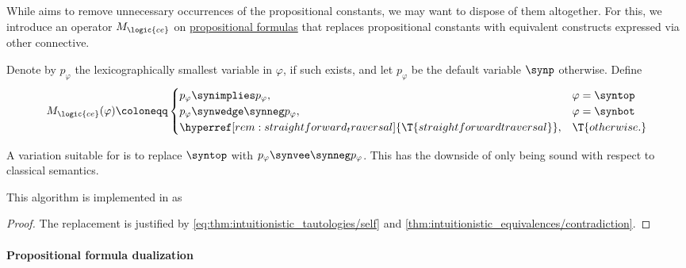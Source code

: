 \begin{algorithm}\label{alg:propositional_constant_expansion}
  While  aims to remove unnecessary occurrences of the propositional constants, we may want to dispose of them altogether. For this, we introduce an operator \( M_{\logic{ce}} \) on \hyperref[def:propositional_formula]{propositional formulas} that replaces propositional constants with equivalent constructs expressed via other connective.

  Denote by \( p_\varphi \) the lexicographically smallest variable in \( \varphi \), if such exists, and let \( p_\varphi \) be the default variable \( \synp \) otherwise. Define
  \begin{equation*}
    M_{\logic{ce}}(\varphi) \coloneqq \begin{cases}
      p_\varphi \synimplies p_\varphi,       &\varphi = \syntop \\
      p_\varphi \synwedge \synneg p_\varphi, &\varphi = \synbot \\
      \hyperref[rem:straightforward_traversal]{\T{straightforward traversal}}, &\T{otherwise.}
    \end{cases}
  \end{equation*}
\end{algorithm}
\begin{comments}
  \item A variation suitable for  is to replace \( \syntop \) with \( p_\varphi \synvee \synneg p_\varphi \). This has the downside of only being sound with respect to classical semantics.

  \item This algorithm is implemented in \cite{notebook:code} as
  \begin{CodeRefDisplay}
  \end{CodeRefDisplay}
\end{comments}
\begin{proof}
  The replacement is justified by \eqref{eq:thm:intuitionistic_tautologies/self} and \cref{thm:intuitionistic_equivalences/contradiction}.
\end{proof}

\paragraph{Propositional formula dualization}

